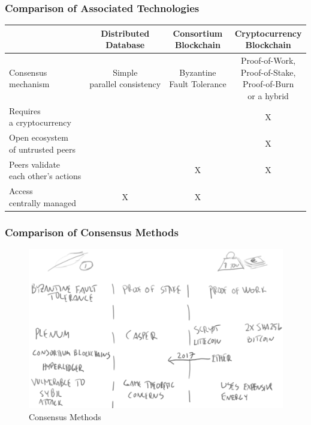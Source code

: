 \documentclass[8pt]{beamer}
\begin{document}
\begin{frame}
\frametitle{Comparison of Associated Technologies}

\begin{tabular}{| l | c | c | c |}
\hline
 & \shortstack{Distributed \\ Database} & \shortstack{Consortium \\ Blockchain} & \shortstack{Cryptocurrency \\ Blockchain} \\
\hline
\shortstack{Consensus \\ mechanism} & \shortstack{Simple \\ parallel consistency} & \shortstack{Byzantine \\ Fault Tolerance} & \shortstack{Proof-of-Work, \\ Proof-of-Stake, \\ Proof-of-Burn \\ or a hybrid} \\
\hline
\shortstack{Requires \\ a cryptocurrency} & & & X \\
\hline
\shortstack{Open ecosystem \\ of untrusted peers} & & & X \\
\hline
\shortstack{Peers validate \\ each other's actions} & & X & X \\
\hline
\shortstack{Access \\ centrally managed} & X & X & \\
\hline
\end{tabular} 

\end{frame}

\begin{frame}
\frametitle{Comparison of Consensus Methods}

\begin{figure}[tb]
 \centering
 \includegraphics[width=8 cm,keepaspectratio=true]{./blockchain_images/comparison.png}
 \caption{Consensus Methods}
\end{figure}

\end{frame}
\end{document}
